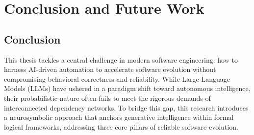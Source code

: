 
\chapter{Conclusion and Future Work} %
\label{ch:chapter6}
\section{Conclusion}
This thesis tackles a central challenge in modern software engineering: how to harness AI-driven automation to accelerate software evolution without compromising behavioral correctness and reliability. While Large Language Models (LLMs) have ushered in a paradigm shift toward autonomous intelligence, their probabilistic nature often fails to meet the rigorous demands of interconnected dependency networks. To bridge this gap, this research introduces a neurosymbolic approach that anchors generative intelligence within formal logical frameworks, addressing three core pillars of reliable software evolution.

